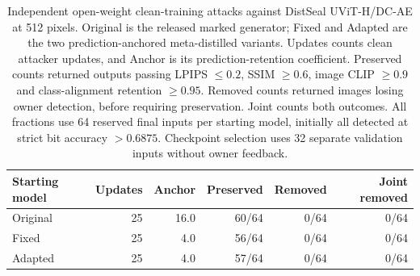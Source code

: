\begin{table}[ht]\centering\small
\begin{tabular}{lrrrrr}\toprule
Starting model & Updates & Anchor & Preserved & Removed & Joint removed\\\midrule
Original & 25 & 16.0 & 60/64 & 0/64 & 0/64\\
Fixed & 25 & 4.0 & 56/64 & 0/64 & 0/64\\
Adapted & 25 & 4.0 & 57/64 & 0/64 & 0/64\\
\bottomrule\end{tabular}
\caption{Independent open-weight clean-training attacks against DistSeal UViT-H/DC-AE at 512 pixels. Original is the released marked generator; Fixed and Adapted are the two prediction-anchored meta-distilled variants. Updates counts clean attacker updates, and Anchor is its prediction-retention coefficient. Preserved counts returned outputs passing LPIPS $\leq0.2$, SSIM $\geq0.6$, image CLIP $\geq0.9$ and class-alignment retention $\geq0.95$. Removed counts returned images losing owner detection, before requiring preservation. Joint counts both outcomes. All fractions use 64 reserved final inputs per starting model, initially all detected at strict bit accuracy $>0.6875$. Checkpoint selection uses 32 separate validation inputs without owner feedback.}\end{table}
